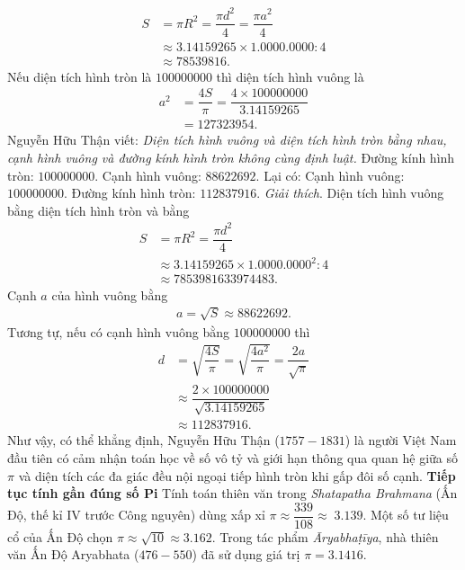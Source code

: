 \begin{multicols}{2}
	\setlength{\belowdisplayskip}{7pt}
	\begin{align*}
			S &= \pi {R^2} = \dfrac{{\pi {d^2}}}{4} = \dfrac{{\pi {a^2}}}{4}\\
			&\approx 3.14159265 \times 1.0000.0000:4 \\
			&\approx 78539816.	
	\end{align*}
	Nếu diện tích hình tròn là $100000000$ thì diện tích hình vuông là
	\begin{align*}
		{a^2} &= \dfrac{{4S}}{\pi } = \dfrac{{4 \times 100000000}}{{3.14159265}}\\ &= 127323954.
	\end{align*}
	Nguyễn Hữu Thận viết:  \textit{Diện tích hình vuông và diện tích hình tròn bằng nhau, cạnh hình vuông và đường kính hình tròn không cùng định luật.}
	\vskip 0.1cm
	Đường kính hình tròn: $100000000$.
	\vskip 0.1cm 
	Cạnh hình vuông: $88622692$.
	\vskip 0.1cm
	Lại có: 
	\vskip 0.1cm
	Cạnh hình vuông: $100000000$.
	\vskip 0.1cm 
	Đường kính hình tròn: $112837916$.
	\vskip 0.1cm
	\textit{Giải thích}. Diện tích hình vuông bằng diện tích hình tròn và bằng 
	\begin{align*}
		S &= \pi {R^2} = \dfrac{{\pi {d^2}}}{4}\\
		&\approx 3.14159265 \times {1.0000.0000^2}:4 \\
		&\approx 7853981633974483.
	\end{align*}
	Cạnh $a$ của hình vuông bằng
	\begin{align*}
		a = \sqrt S  \approx 88622692.
	\end{align*}
	Tương tự, nếu có cạnh hình vuông bằng $100000000$ thì  
	\begin{align*}
		d &= \sqrt {\dfrac{{4S}}{\pi }}  = \sqrt {\dfrac{{4{a^2}}}{\pi }}  = \dfrac{{2a}}{{\sqrt \pi  }} \\
		&\approx \dfrac{{2 \times 100000000}}{{\sqrt {3.14159265} }} \\
		&\approx 112837916.
	\end{align*}
	Như vậy, có thể khẳng định, Nguyễn Hữu Thận ($1757-1831$) là người Việt Nam đầu tiên có cảm nhận toán học về số vô tỷ và giới hạn thông qua quan hệ giữa số $\pi$ và diện tích các đa giác đều nội ngoại tiếp hình tròn khi gấp đôi số cạnh.
	\vskip 0.1cm
	\textbf{\color{lichsutoanhoc}Tiếp tục tính gần đúng số Pi}
	\vskip 0.1cm
	Tính toán thiên văn trong \textit{Shatapatha Brahmana} (Ấn Độ, thế kỉ IV trước Công nguyên) dùng xấp xỉ $\pi  \approx \dfrac{{339}}{{108}} \approx \;3.139$.  Một số tư liệu cổ của Ấn Độ chọn $\pi  \approx \sqrt {10}  \approx 3.162$. Trong tác phẩm \textit{Āryabhaṭīya}, nhà thiên văn Ấn Độ Aryabhata ($476-550$) đã sử dụng giá trị $\pi  = 3.1416$.

\end{multicols}

